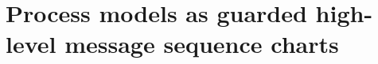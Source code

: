 \section{Process models as guarded high-level message sequence charts\label{section:background-process-models}}
